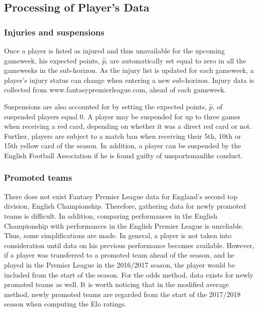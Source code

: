 \subsection{Processing of Player's Data}

\subsubsection{Injuries and suspensions}
Once a player is listed as injured and thus unavailable for the upcoming gameweek, his expected points, $\hat{p}$, are automatically set equal to zero in all the gameweeks in the sub-horizon. As the injury list is updated for each gameweek, a player's injury status can change when entering a new sub-horizon. Injury data is collected from www.fantasypremierleague.com, ahead of each gameweek. 

\newpar

Suspensions are also accounted for by setting the expected points, $\hat{p}$, of suspended players equal 0. A player may be suspended for up to three games when receiving a red card, depending on whether it was a direct red card or not. Further, players are subject to a match ban when receiving their 5th, 10th or 15th yellow card of the season. In addition, a player can be suspended by the English Football Association if he is found guilty of unsportsmanlike conduct. 


\subsubsection{Promoted teams}
There does not exist Fantasy Premier League data for England's second top  division, English Championship. Therefore, gathering data for newly promoted teams is difficult. In addition, comparing performances in the English Championship with performances in the English Premier League is unreliable. Thus, some simplifications are made. In general, a player is not taken into consideration until data on his previous performance becomes available. However, if a player was transferred to a promoted team ahead of the season, and he played in the Premier League in the 2016/2017 season, the player would be included from the start of the season. For the odds method, data exists for newly promoted teams as well. It is worth noticing that in the modified average method, newly promoted teams are regarded from the start of the 2017/2018 season when computing the Elo ratings. 

